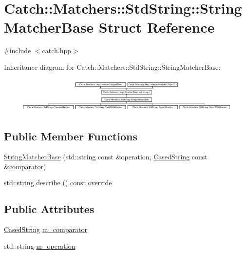 \hypertarget{structCatch_1_1Matchers_1_1StdString_1_1StringMatcherBase}{}\section{Catch\+:\+:Matchers\+:\+:Std\+String\+:\+:String\+Matcher\+Base Struct Reference}
\label{structCatch_1_1Matchers_1_1StdString_1_1StringMatcherBase}


{\ttfamily \#include $<$catch.\+hpp$>$}

Inheritance diagram for Catch\+:\+:Matchers\+:\+:Std\+String\+:\+:String\+Matcher\+Base\+:\begin{figure}[H]
\begin{center}
\leavevmode
\includegraphics[height=1.848185cm]{structCatch_1_1Matchers_1_1StdString_1_1StringMatcherBase}
\end{center}
\end{figure}
\subsection*{Public Member Functions}
\begin{DoxyCompactItemize}
\item 
\mbox{\hyperlink{structCatch_1_1Matchers_1_1StdString_1_1StringMatcherBase_a3a9b66bae298ae27058478529b4bb39d}{String\+Matcher\+Base}} (std\+::string const \&operation, \mbox{\hyperlink{structCatch_1_1Matchers_1_1StdString_1_1CasedString}{Cased\+String}} const \&comparator)
\item 
std\+::string \mbox{\hyperlink{structCatch_1_1Matchers_1_1StdString_1_1StringMatcherBase_a47af030f8cea42a601ffb1000eea5cca}{describe}} () const override
\end{DoxyCompactItemize}
\subsection*{Public Attributes}
\begin{DoxyCompactItemize}
\item 
\mbox{\hyperlink{structCatch_1_1Matchers_1_1StdString_1_1CasedString}{Cased\+String}} \mbox{\hyperlink{structCatch_1_1Matchers_1_1StdString_1_1StringMatcherBase_a17c9f0fe40587070ffe998c193742831}{m\+\_\+comparator}}
\item 
std\+::string \mbox{\hyperlink{structCatch_1_1Matchers_1_1StdString_1_1StringMatcherBase_a7a25c4b7d863e9a1c406d81efd0f83ca}{m\+\_\+operation}}
\end{DoxyCompactItemize}
